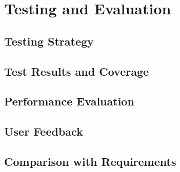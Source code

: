 \section{Testing and Evaluation}
  \label{sec:testing}

  \subsection{Testing Strategy}
  \label{subsec:testing-strategy}

  \subsection{Test Results and Coverage}
  \label{subsec:test-results}

  \subsection{Performance Evaluation}
  \label{subsec:performance-evaluation}

  \subsection{User Feedback}
  \label{subsec:user-feedback}

  \subsection{Comparison with Requirements}
  \label{subsec:comparison-requirements}